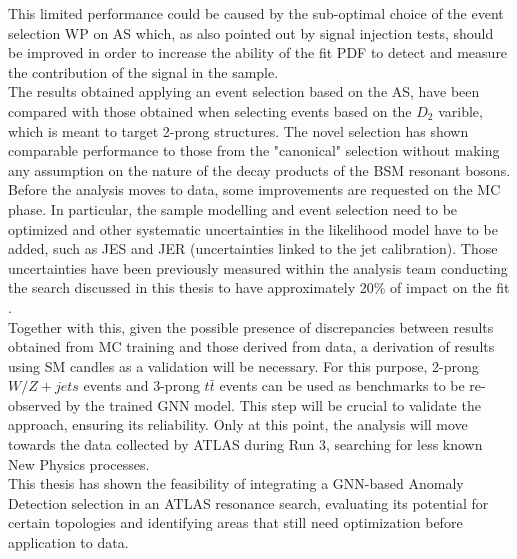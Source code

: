 This limited performance could be caused by the sub-optimal choice of the event selection WP on AS which, as also pointed out by signal injection tests, should be improved in order to increase the ability of the fit PDF to detect and measure the contribution of the signal in the sample.\\
The results obtained applying an event selection based on the AS, have been compared with those obtained when selecting events based on the $D_2$ varible, which is meant to target 2-prong structures.
The novel selection has shown comparable performance to those from the "canonical" selection without making any assumption on the nature of the decay products of the BSM resonant bosons.\\ 
Before the analysis moves to data, some improvements are requested on the MC phase.
In particular, the sample modelling and event selection need to be optimized and other systematic uncertainties in the likelihood model have to be added, such as JES and JER (uncertainties linked to the jet calibration).
Those uncertainties have been previously measured within the analysis team conducting the search discussed in this thesis to have approximately 20\% of impact on the fit \cite{PhDGRusso}.\\
Together with this, given the possible presence of discrepancies between results obtained from MC training and those derived from data, a derivation of results using SM candles as a validation will be necessary.
For this purpose, 2-prong $W/Z+jets$ events and 3-prong $t\bar{t}$ events can be used as benchmarks to be re-observed by the trained GNN model.
This step will be crucial to validate the approach, ensuring its reliability.
Only at this point, the analysis will move towards the data collected by ATLAS during Run 3, searching for less known New Physics processes.\\
This thesis has shown the feasibility of integrating a GNN-based Anomaly Detection selection in an ATLAS resonance search, evaluating its potential for certain topologies and identifying areas that still need optimization before application to data.
